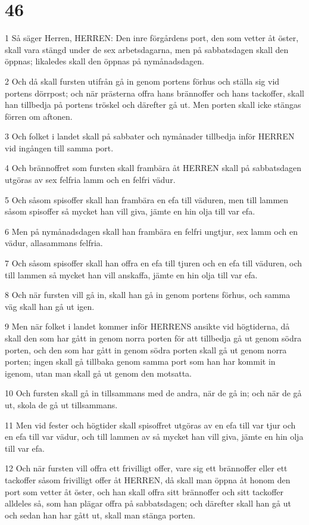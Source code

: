 \chapter{46}

\par 1 Så säger Herren, HERREN: Den inre förgårdens port, den som vetter åt öster, skall vara stängd under de sex arbetsdagarna, men på sabbatsdagen skall den öppnas; likaledes skall den öppnas på nymånadsdagen.
\par 2 Och då skall fursten utifrån gå in genom portens förhus och ställa sig vid portens dörrpost; och när prästerna offra hans brännoffer och hans tackoffer, skall han tillbedja på portens tröskel och därefter gå ut. Men porten skall icke stängas förren om aftonen.
\par 3 Och folket i landet skall på sabbater och nymånader tillbedja inför HERREN vid ingången till samma port.
\par 4 Och brännoffret som fursten skall frambära åt HERREN skall på sabbatsdagen utgöras av sex felfria lamm och en felfri vädur.
\par 5 Och såsom spisoffer skall han frambära en efa till väduren, men till lammen såsom spisoffer så mycket han vill giva, jämte en hin olja till var efa.
\par 6 Men på nymånadsdagen skall han frambära en felfri ungtjur, sex lamm och en vädur, allasammans felfria.
\par 7 Och såsom spisoffer skall han offra en efa till tjuren och en efa till väduren, och till lammen så mycket han vill anskaffa, jämte en hin olja till var efa.
\par 8 Och när fursten vill gå in, skall han gå in genom portens förhus, och samma väg skall han gå ut igen.
\par 9 Men när folket i landet kommer inför HERRENS ansikte vid högtiderna, då skall den som har gått in genom norra porten för att tillbedja gå ut genom södra porten, och den som har gått in genom södra porten skall gå ut genom norra porten; ingen skall gå tillbaka genom samma port som han har kommit in igenom, utan man skall gå ut genom den motsatta.
\par 10 Och fursten skall gå in tillsammans med de andra, när de gå in; och när de gå ut, skola de gå ut tillsammans.
\par 11 Men vid fester och högtider skall spisoffret utgöras av en efa till var tjur och en efa till var vädur, och till lammen av så mycket han vill giva, jämte en hin olja till var efa.
\par 12 Och när fursten vill offra ett frivilligt offer, vare sig ett brännoffer eller ett tackoffer såsom frivilligt offer åt HERREN, då skall man öppna åt honom den port som vetter åt öster, och han skall offra sitt brännoffer och sitt tackoffer alldeles så, som han plägar offra på sabbatsdagen; och därefter skall han gå ut och sedan han har gått ut, skall man stänga porten.
